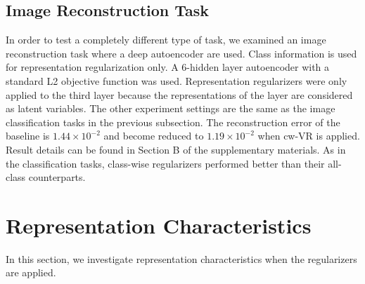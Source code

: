 \documentclass[letterpaper]{article} %
\begin{document}
\subsection{Image Reconstruction Task}
In order to test a completely different type of task, we examined an image reconstruction task where a deep autoencoder are used. Class information is used for representation regularization only. A 6-hidden layer autoencoder with a standard L2 objective function was used. Representation regularizers were only applied to the third layer because the representations of the layer are considered as latent variables. The other experiment settings are the same as the image classification tasks in the previous subsection. The reconstruction error of the baseline is $1.44 \times 10^{-2}$ and become reduced to $1.19 \times 10^{-2}$ when cw-VR is applied. Result details can be found in Section B of the supplementary materials.
As in the classification tasks, class-wise regularizers performed better than their all-class counterparts.








\section{Representation Characteristics}


In this section, we investigate representation characteristics when the regularizers are applied. 
\end{document}
